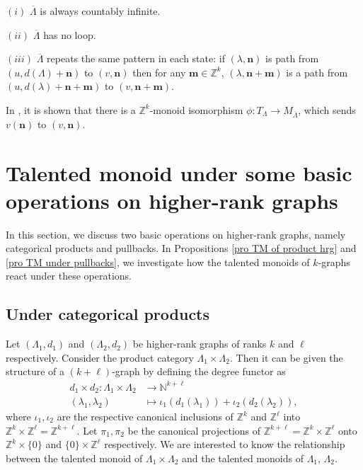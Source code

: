 \documentclass[a4paper,reqno,12pt]{amsart}
\numberwithin{equation}{section}
\theoremstyle{definition}
\theoremstyle{remark}
\newcommand{\N}{\mathbf{n}}
\newcommand{\M}{\mathbf{m}}
\begin{document}
$(i)$ $\overline{\Lambda}$ is always countably infinite.

$(ii)$ $\overline{\Lambda}$ has no loop.

$(iii)$ $\overline{\Lambda}$ repeats the same pattern in each state: if $(\lambda,\N)$ is path from $(u,d(\Lambda)+\N)$ to $(v,\N)$ then for any $\M\in \mathbb{Z}^k$, $(\lambda,\N+\M)$ is a path from $(u,d(\lambda)+\N+\M)$ to $(v,\N+\M)$.

In \cite[Theorem 3.16$(ii)$]{HMPS1}, it is shown that there is a $\mathbb{Z}^k$-monoid isomorphism $\phi:T_\Lambda\longrightarrow M_{\overline{\Lambda}}$, which sends $v(\N)$ to $(v,\N)$. 


\section{Talented monoid under some basic operations on higher-rank graphs}\label{sec TM under product and pullbacks}
In this section, we discuss two basic operations on higher-rank graphs, namely categorical products and pullbacks. In Propositions \ref{pro TM of product hrg} and \ref{pro TM under pullbacks}, we investigate how the talented monoids of $k$-graphs react under these operations.

\subsection{Under categorical products}\label{ssec categorical product} Let $(\Lambda_1,d_1)$ and $(\Lambda_2,d_2)$ be higher-rank graphs of ranks $k$ and $\ell$ respectively. Consider the product category $\Lambda_1\times \Lambda_2$. Then it can be given the structure of a $(k+\ell)$-graph by defining the degree functor as 
\begin{align*}
d_1\times d_2:\Lambda_1\times \Lambda_2&\longrightarrow \mathbb{N}^{k+\ell}\\
(\lambda_1,\lambda_2)& \longmapsto \iota_1(d_1(\lambda_1))+\iota_2(d_2(\lambda_2)),
\end{align*}
where $\iota_1,\iota_2$ are the respective canonical inclusions of $\mathbb{Z}^k$ and $\mathbb{Z}^\ell$ into $\mathbb{Z}^k\times \mathbb{Z}^\ell=\mathbb{Z}^{k+\ell}$. Let $\pi_1,\pi_2$ be the canonical projections of $\mathbb{Z}^{k+\ell}=\mathbb{Z}^k\times \mathbb{Z}^\ell$ onto $\mathbb{Z}^k\times \{0\}$ and $\{0\}\times \mathbb{Z}^\ell$ respectively. We are interested to know the relationship between the talented monoid of $\Lambda_1\times \Lambda_2$ and the talented monoids of $\Lambda_1$, $\Lambda_2$. 
\end{document}
